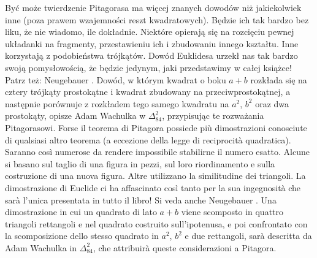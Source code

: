 Być może twierdzenie Pitagorasa ma więcej znanych dowodów niż jakiekolwiek inne (poza prawem wzajemności reszt kwadratowych). %
Będzie ich tak bardzo bez liku, że nie wiadomo, ile dokładnie. %
Niektóre opierają się na rozcięciu pewnej układanki na fragmenty, przestawieniu ich i zbudowaniu innego kształtu. %
Inne korzystają z podobieństwa trójkątów. %
Dowód Euklidesa urzekł nas tak bardzo swoją pomysłowością, że będzie jedynym, jaki przedstawimy w całej książce! %
Patrz też: Neugebauer \cite[s. 39-41]{neugebauer_2018}. %
Dowód, w którym kwadrat o boku $a+b$ rozkłada się na cztery trójkąty prostokątne i kwadrat zbudowany na przeciwprostokątnej, a następnie porównuje z rozkładem tego samego kwadratu na $a^2$, $b^2$ oraz dwa prostokąty, opisze Adam Wachulka w $\Delta_{84}^{2}$, przypisując te rozważania Pitagorasowi. %
Forse il teorema di Pitagora possiede più dimostrazioni conosciute di qualsiasi altro teorema (a eccezione della legge di reciprocità quadratica). %
Saranno così numerose da rendere impossibile stabilirne il numero esatto. %
Alcune si basano sul taglio di una figura in pezzi, sul loro riordinamento e sulla costruzione di una nuova figura. %
Altre utilizzano la similitudine dei triangoli. %
La dimostrazione di Euclide ci ha affascinato così tanto per la sua ingegnosità che sarà l'unica presentata in tutto il libro! %
Si veda anche Neugebauer \cite[p. 39--41]{neugebauer_2018}. %
Una dimostrazione in cui un quadrato di lato $a+b$ viene scomposto in quattro triangoli rettangoli e nel quadrato costruito sull'ipotenusa, e poi confrontato con la scomposizione dello stesso quadrato in $a^2$, $b^2$ e due rettangoli, sarà descritta da Adam Wachulka in $\Delta_{84}^{2}$, che attribuirà queste considerazioni a Pitagora. %

